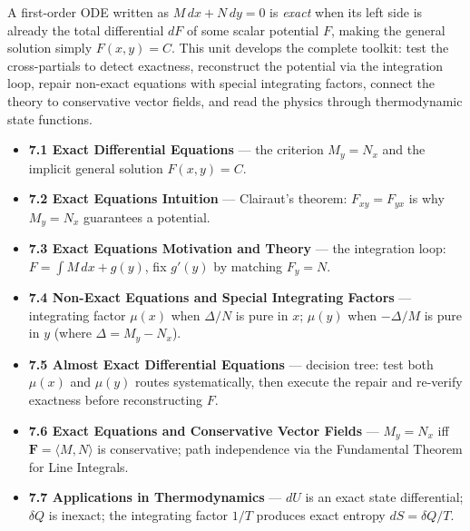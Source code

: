 \begin{topicsbox}
A first-order ODE written as $M\,dx + N\,dy = 0$ is \emph{exact} when its
left side is already the total differential $dF$ of some scalar potential $F$,
making the general solution simply $F(x,y)=C$. This unit develops the complete
toolkit: test the cross-partials to detect exactness, reconstruct the potential
via the integration loop, repair non-exact equations with special integrating
factors, connect the theory to conservative vector fields, and read the physics
through thermodynamic state functions.
\begin{itemize}[leftmargin=1.4em, itemsep=3pt]
    \item \textbf{7.1 Exact Differential Equations} --- the criterion $M_y = N_x$
          and the implicit general solution $F(x,y)=C$.
    \item \textbf{7.2 Exact Equations Intuition} --- Clairaut's theorem:
          $F_{xy}=F_{yx}$ is why $M_y=N_x$ guarantees a potential.
    \item \textbf{7.3 Exact Equations Motivation and Theory} --- the integration
          loop: $F = \int M\,dx + g(y)$, fix $g'(y)$ by matching $F_y = N$.
    \item \textbf{7.4 Non-Exact Equations and Special Integrating Factors} ---
          integrating factor $\mu(x)$ when $\Delta/N$ is pure in $x$; $\mu(y)$
          when $-\Delta/M$ is pure in $y$ (where $\Delta = M_y - N_x$).
    \item \textbf{7.5 Almost Exact Differential Equations} --- decision tree:
          test both $\mu(x)$ and $\mu(y)$ routes systematically, then execute
          the repair and re-verify exactness before reconstructing $F$.
    \item \textbf{7.6 Exact Equations and Conservative Vector Fields} ---
          $M_y=N_x$ iff $\mathbf F=\langle M,N\rangle$ is conservative;
          path independence via the Fundamental Theorem for Line Integrals.
    \item \textbf{7.7 Applications in Thermodynamics} --- $dU$ is an exact
          state differential; $\delta Q$ is inexact; the integrating factor
          $1/T$ produces exact entropy $dS = \delta Q/T$.
\end{itemize}
\end{topicsbox}

